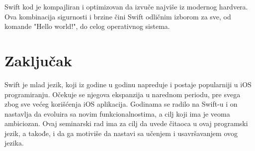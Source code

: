 \documentclass[a4paper]{article}
\begin{document}
Swift kod je kompajliran i optimizovan da izvuče najviše iz modernog hardvera. Ova kombinacija sigurnosti i brzine čini Swift odličnim izborom za sve, od komande "Hello world!", do celog operativnog sistema.

\section{Zaključak}
\label{sec:zakljucak}
Swift je mlad jezik, koji iz godine u godinu napreduje i postaje popularniji u iOS programiranju. Očekuje se njegova ekspanzija u narednom periodu, pre svega zbog sve većeg korišćenja iOS aplikacija. Godinama se radilo na Swift-u i on nastavlja da evoluira sa novim funkcionalnostima, a cilj koji ima je veoma ambiciozan. Ovaj seminarski rad ima za cilj da uvede čitaoca u ovaj programski jezik, a takođe, i da ga motiviše da nastavi sa učenjem i usavršavanjem ovog jezika. 

\appendix
 


\appendix
\end{document}
